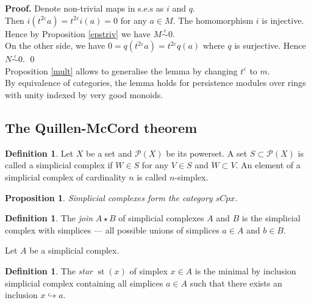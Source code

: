 \documentclass[english,12pt]{article}
\newcounter{stmcounter}[section]
\numberwithin{equation}{section}
\newtheorem{proposition}[stmcounter]{Proposition}
\theoremstyle{definition}
\newtheorem{definition}[stmcounter]{Definition}
\theoremstyle{remark}
\newenvironment{pf}{\noindent\textbf{Proof.}}{\qed}
\newcommand{\define}[1]{{\textit{#1}}}
\begin{document}
\begin{pf}
  Denote non-trivial maps in s.e.s as $i$ and $q$.\\

  Then $i(t^{2\varepsilon}a) = t^{2\varepsilon}i(a) = 0$ for any $a \in M$. The homomorphism $i$ is injective. Hence by Proposition \ref{epstriv} we have $M \stackrel{\varepsilon}{\sim} 0$.\\

  On the other side, we have $0 = q(t^{2\varepsilon}a) = t^{2\varepsilon}q(a)$ where $q$ is surjective. Hence $N \stackrel{\varepsilon}{\sim} 0$.
\end{pf}\\

Proposition \ref{mult} allows to generalise the lemma by changing $t^{\varepsilon}$ to $m$.\\

By equivalence of categories, the lemma holds for persistence modules over rings with unity indexed by very good monoids.

\subsection{The Quillen-McCord theorem}

\begin{definition}
  Let $X$ be a set and $\mathcal{P}(X)$ be its powerset. A set $S \subset \mathcal{P}(X)$ is called a simplicial complex if $W \in S$ for any $V \in S$ and $W \subset V$. An element of a simplicial complex of cardinality $n$ is called $n$-simplex.
\end{definition}

\begin{proposition}
  Simplicial complexes form the category $sCpx$.
\end{proposition}

\begin{definition}
  The \define{join} $A \star B$ of simplicial complexes $A$ and $B$ is the simplicial complex with simplices --- all possible unions of simplices $a \in A$ and $b \in B$.
\end{definition}

Let $A$ be a simplicial complex.

\begin{definition}
  The \define{star} $\operatorname{st}(x)$ of simplex $x \in A$ is the minimal by inclusion simplicial complex containing all simplices $a \in A$ such that there exists an inclusion $x \hookrightarrow a$.
\end{definition}
\end{document}
